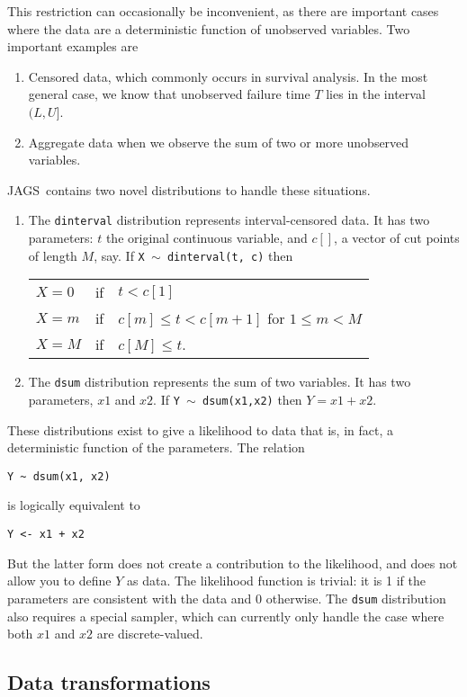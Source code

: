 \documentclass[11pt, a4paper, titlepage]{report}
\newcommand{\JAGS}{\textsf{JAGS}}
\begin{document}
This restriction can occasionally be inconvenient, as there are
important cases where the data are a deterministic function of
unobserved variables.  Two important examples are
\begin{enumerate}
\item Censored data, which commonly occurs in survival analysis. In
the most general case, we know that unobserved failure time $T$
lies in the interval $(L,U]$.
\item Aggregate data when we observe the sum of two or more
unobserved variables.
\end{enumerate}
\JAGS\ contains two novel distributions to handle these situations.  
\begin{enumerate}
\item The \texttt{dinterval} distribution represents interval-censored
data. It has two parameters: $t$ the original continuous variable, and
$c[]$, a vector of cut points of length $M$, say. If \texttt{X $\sim$
dinterval(t, c)} then 

\begin{tabular}{lll}
$X=0$   & if & $t < c[1]$\\
$X=m$   & if & $c[m] \leq t < c[m+1]$ for $1 \leq m < M$\\
$X = M$ & if & $c[M] \leq t$.
\end{tabular}

\item The \texttt{dsum} distribution represents the sum of two
variables.  It has two parameters, $x1$ and $x2$. If \texttt{Y $\sim$
dsum(x1,x2)} then $Y=x1+x2$.
\end{enumerate}
These distributions exist to give a likelihood to data that is, in fact,
a deterministic function of the parameters.  The relation
\begin{verbatim}
Y ~ dsum(x1, x2)
\end{verbatim}
is logically equivalent to
\begin{verbatim}
Y <- x1 + x2
\end{verbatim}
But the latter form does not create a contribution to the likelihood,
and does not allow you to define $Y$ as data.  The likelihood function
is trivial: it is 1 if the parameters are consistent with the data and
0 otherwise.  The \texttt{dsum} distribution also requires a special
sampler, which can currently only handle the case where both $x1$ and
$x2$ are discrete-valued.

\subsection{Data transformations}
\label{section:data:tranformations}
\end{document}
